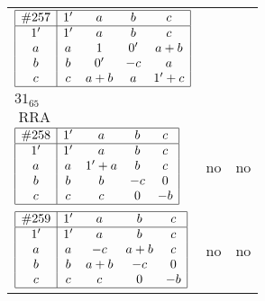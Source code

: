 \documentclass[12pt]{article}
\newcommand\RRA{\operatorname{RRA}}
\newcommand{\join}{\mathbin{+}}%
\newcommand{\id}{{1'}}%
\renewcommand{\div}{0'}
\renewcommand{\top}{1}%
\begin{document}
\begin{center}
\begin{longtable}{l|c|c}
$
\begin{array}{|c|cccc|} \hline
\#257 & \id & a & b & c \\ \hline
\id & \id & a & b & c \\
a & a & \top & \div & a \join b \\
b & b & \div & -c & a \\
c & c & a \join b & a & \id \join c \\ \hline
\end{array}
$
 & \begin{tabular}{c} yes \\ $31_{65}$ \\ $\RRA$ \end{tabular} 
 & \adjustbox{valign=c, max height=1.6cm}{$
\left[ \begin{array}{cccccc}
\id & a & a & b & a & b \\ 
a & \id & a & a & c & c \\ 
a & a & \id & b & b & a \\ 
b & a & b & \id & a & b \\ 
a & c & b & a & \id & c \\ 
b & c & a & b & c & \id
\end{array}\right]
$}
      \\[15mm]

$
\begin{array}{|c|cccc|} \hline
\#258 & \id & a & b & c \\ \hline
\id & \id & a & b & c \\
a & a & \id \join a & b & c \\
b & b & b & -c & 0 \\
c & c & c & 0 & -b \\ \hline
\end{array}
$
 & no  
 & no     \\[15mm]

$
\begin{array}{|c|cccc|} \hline
\#259 & \id & a & b & c \\ \hline
\id & \id & a & b & c \\
a & a & -c & a \join b & c \\
b & b & a \join b & -c & 0 \\
c & c & c & 0 & -b \\ \hline
\end{array}
$
 & no  
 & no      \\[15mm]


\end{longtable}
\end{center}
\end{document}
